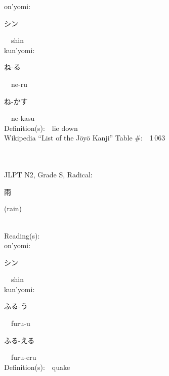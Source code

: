 \begin{multicols}{2}
{\hspace*{1em}}on'yomi:\ \ \\
{\hspace*{2em}}{\begin{CJK}{UTF8}{min} シン \end{CJK}}\ \ shin\ \ \\
{\hspace*{1em}}kun'yomi:\ \ \\
{\hspace*{2em}}{\begin{CJK}{UTF8}{min} ね-る \end{CJK}}\ \ ne-ru\ \ \\
{\hspace*{2em}}{\begin{CJK}{UTF8}{min} ね-かす \end{CJK}}\ \ ne-kasu\ \ \\
Definition(s):\ \ lie down \\
Wikipedia ``List of the J\=oy\=o Kanji'' Table \#:\ \ 1\,063 \\
\ \ \\
{\fontsize{34pt}{40pt}  }\ \ \\  %
{JLPT N2, Grade S, Radical:\ \ {\begin{CJK}{UTF8}{min} 雨 \end{CJK}} (rain) } \\
Reading(s):\ \ \\
{\hspace*{1em}}on'yomi:\ \ \\
{\hspace*{2em}}{\begin{CJK}{UTF8}{min} シン \end{CJK}}\ \ shin\ \ \\
{\hspace*{1em}}kun'yomi:\ \ \\
{\hspace*{2em}}{\begin{CJK}{UTF8}{min} ふる-う \end{CJK}}\ \ furu-u\ \ \\
{\hspace*{2em}}{\begin{CJK}{UTF8}{min} ふる-える \end{CJK}}\ \ furu-eru\ \ \\
Definition(s):\ \ quake \\

\end{multicols}
